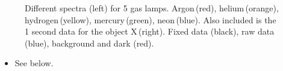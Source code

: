 \documentclass[twocolumn]{aastex6}
\begin{document}
\begin{figure}[ht]
  \centering
  \caption{Different spectra (left) for 5 gas lamps. Argon\,(red), helium\,(orange), hydrogen\,(yellow), mercury\,(green), neon\,(blue). Also included is the 1 second data for the object X\,(right). Fixed data (black), raw data (blue), background and dark (red).}
  \label{graphs}
\end{figure}



\begin{itemize}
	\item{See below.}
\end{itemize}
\end{document}
